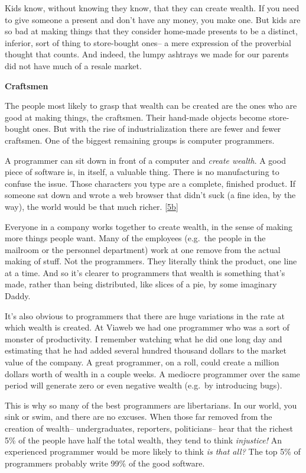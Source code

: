 \documentclass[12pt]{book}
\begin{document}
Kids know, without knowing they know, that they can create wealth. If
you need to give someone a present and don't have any money, you make
one. But kids are so bad at making things that they consider home-made
presents to be a distinct, inferior, sort of thing to store-bought
ones-- a mere expression of the proverbial thought that counts. And
indeed, the lumpy ashtrays we made for our parents did not have much of
a resale market.

\textbf{Craftsmen}

The people most likely to grasp that wealth can be created are the ones
who are good at making things, the craftsmen. Their hand-made objects
become store-bought ones. But with the rise of industrialization there
are fewer and fewer craftsmen. One of the biggest remaining groups is
computer programmers.

A programmer can sit down in front of a computer and \emph{create
wealth}. A good piece of software is, in itself, a valuable thing. There
is no manufacturing to confuse the issue. Those characters you type are
a complete, finished product. If someone sat down and wrote a web
browser that didn't suck (a fine idea, by the way), the world would be
that much richer. {[}\hyperref[f5bn]{5b}{]}

Everyone in a company works together to create wealth, in the sense of
making more things people want. Many of the employees (e.g.~the people
in the mailroom or the personnel department) work at one remove from the
actual making of stuff. Not the programmers. They literally think the
product, one line at a time. And so it's clearer to programmers that
wealth is something that's made, rather than being distributed, like
slices of a pie, by some imaginary Daddy.

It's also obvious to programmers that there are huge variations in the
rate at which wealth is created. At Viaweb we had one programmer who was
a sort of monster of productivity. I remember watching what he did one
long day and estimating that he had added several hundred thousand
dollars to the market value of the company. A great programmer, on a
roll, could create a million dollars worth of wealth in a couple weeks.
A mediocre programmer over the same period will generate zero or even
negative wealth (e.g.~by introducing bugs).

This is why so many of the best programmers are libertarians. In our
world, you sink or swim, and there are no excuses. When those far
removed from the creation of wealth-- undergraduates, reporters,
politicians-- hear that the richest 5\% of the people have half the
total wealth, they tend to think \emph{injustice!} An experienced
programmer would be more likely to think \emph{is that all?} The top 5\%
of programmers probably write 99\% of the good software.
\end{document}
